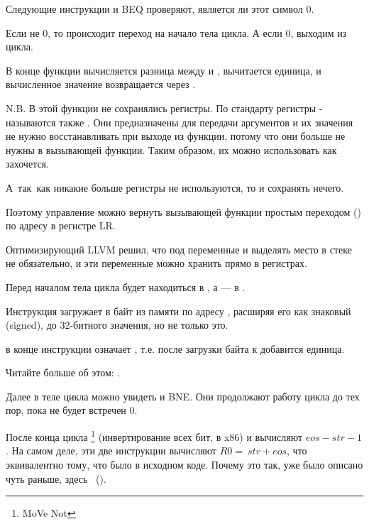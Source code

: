 Следующие инструкции \CMP и \ac{BEQ} проверяют, является ли этот символ 0.

Если не 0, то происходит переход на начало тела цикла.
А если 0, выходим из цикла.

В конце функции вычисляется разница между 
 и , вычитается единица, и вычисленное 
значение возвращается через .

N.B. В этой функции не сохранялись регистры.
По стандарту регистры - называются также .
Они предназначены для передачи аргументов и 
их значения не нужно восстанавливать при выходе из функции, потому что они больше не нужны в вызывающей функции.
Таким образом, их можно использовать как захочется.

А~так~как никакие больше регистры не используются, то и сохранять нечего.

Поэтому управление можно вернуть вызывающей функции 
простым переходом () по адресу в регистре \ac{LR}.

\mysubparagraph{\OptimizingXcodeIV (\ThumbMode)}



Оптимизирующий LLVM решил, что под переменные  и  выделять место в стеке не обязательно,
и эти переменные можно хранить прямо в регистрах.

Перед началом тела цикла  будет находиться в , 
а  --- в .

Инструкция  загружает в  байт из памяти по адресу , 
расширяя его как знаковый (signed), до 32-битного
значения, но не только это.

 в конце инструкции означает ,
т.е. после загрузки байта к  добавится единица.

Читайте больше об этом: .

Далее в теле цикла можно увидеть \CMP и \ac{BNE}. Они продолжают работу цикла до тех пор, 
пока не будет встречен 0.

После конца цикла \footnote{MoVe Not} (инвертирование всех бит, \NOT в x86) и \ADD вычисляют $eos - str - 1$.
На самом деле, эти две инструкции вычисляют $R0 = ~str + eos$, 
что эквивалентно тому, что было в исходном коде. Почему это так, уже было описано чуть раньше, здесь 
~().

